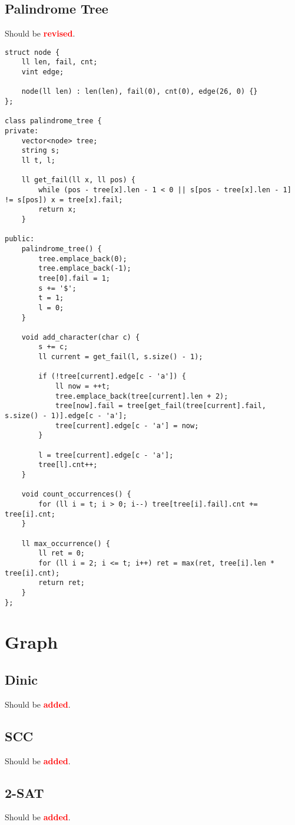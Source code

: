 \documentclass[landscape, 8pt, a4paper, oneside, twocolumn]{extarticle}
\newcommand{\revised}{Should be \textcolor{red}{\textbf{revised}}.}
\newcommand{\added}{Should be \textcolor{red}{\textbf{added}}.}
\begin{document}
\subsection{Palindrome Tree}
\revised
\begin{verbatim}
struct node {
    ll len, fail, cnt;
    vint edge;

    node(ll len) : len(len), fail(0), cnt(0), edge(26, 0) {}
};

class palindrome_tree {
private:
    vector<node> tree;
    string s;
    ll t, l;

    ll get_fail(ll x, ll pos) {
        while (pos - tree[x].len - 1 < 0 || s[pos - tree[x].len - 1] != s[pos]) x = tree[x].fail;
        return x;
    }

public:
    palindrome_tree() {
        tree.emplace_back(0);
        tree.emplace_back(-1);
        tree[0].fail = 1;
        s += '$';
        t = 1;
        l = 0;
    }

    void add_character(char c) {
        s += c;
        ll current = get_fail(l, s.size() - 1);

        if (!tree[current].edge[c - 'a']) {
            ll now = ++t;
            tree.emplace_back(tree[current].len + 2);
            tree[now].fail = tree[get_fail(tree[current].fail, s.size() - 1)].edge[c - 'a'];
            tree[current].edge[c - 'a'] = now;
        }

        l = tree[current].edge[c - 'a'];
        tree[l].cnt++;
    }

    void count_occurrences() {
        for (ll i = t; i > 0; i--) tree[tree[i].fail].cnt += tree[i].cnt;
    }

    ll max_occurrence() {
        ll ret = 0;
        for (ll i = 2; i <= t; i++) ret = max(ret, tree[i].len * tree[i].cnt);
        return ret;
    }
};
\end{verbatim}
\section{Graph}
\subsection{Dinic}
\added
\subsection{SCC}
\added
\subsection{2-SAT}
\added
\end{document}
